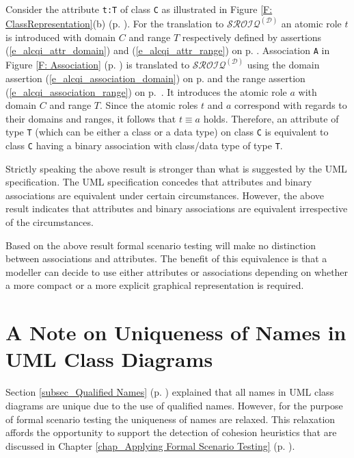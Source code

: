 Consider the attribute \texttt{t:T} of class \texttt{C} as illustrated in Figure \ref{F: ClassRepresentation}(b) (p. \pageref{F: ClassRepresentation}). For the translation to 
$\mathcal{SROIQ}^{(\mathcal{D})}$ an atomic 
role $t$ is introduced with domain $C$ and range $T$ respectively defined by assertions (\ref{e_alcqi_attr_domain}) and (\ref{e_alcqi_attr_range}) on p. \pageref{e_alcqi_attr_range}.
Association \texttt{A} in Figure \ref{F: Association} (p. \pageref{F: Association}) is translated to $\mathcal{SROIQ}^{(\mathcal{D})}$ using the domain assertion (\ref{e_alcqi_association_domain}) on p. \pageref{e_alcqi_association_domain}
and the range assertion (\ref{e_alcqi_association_range}) on p.~\pageref{e_alcqi_association_range}.
It introduces the atomic role $a$ with domain $C$ and range $T$. Since the atomic 
roles $t$ and $a$ correspond with regards to their domains and ranges, it follows that $t \equiv a$ holds.
Therefore, an attribute of type \texttt{T} (which can be either a class or a data type) 
on class \texttt{C} is equivalent to class
\texttt{C} having a binary association with class/data type of type \texttt{T}. 

Strictly speaking the above result is stronger than what is suggested by the UML specification. The UML specification concedes that attributes and binary associations are equivalent
under certain circumstances. However, the above result indicates that attributes and binary associations are equivalent irrespective of the circumstances.

Based on the above result formal scenario testing will make no distinction between associations and attributes.
The benefit of this equivalence is that a modeller can decide to use either attributes or associations depending on whether a more compact or a more explicit graphical representation is required.


\section{A Note on Uniqueness of Names in UML Class Diagrams} \label{sec_A Note on Uniqueness of Names in UML Class Diagrams}
Section \ref{subsec_Qualified Names} (p. \pageref{subsec_Qualified Names}) 
explained that all names in UML class diagrams are unique due to the use of qualified names. 
However, for the purpose of formal scenario testing the uniqueness of names are relaxed. 
This relaxation affords the opportunity to support the detection of cohesion heuristics 
that are discussed in Chapter \ref{chap_Applying Formal Scenario Testing} 
(p. \pageref{chap_Applying Formal Scenario Testing}).

